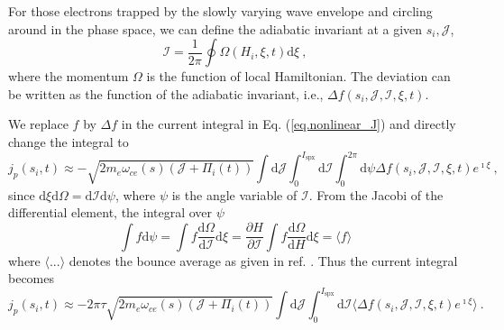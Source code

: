 For those electrons trapped by the slowly varying wave envelope and circling around in the phase space, we can define the adiabatic invariant at a given $s_i,\mathcal{J}$,
\begin{equation}\label{eq.def_I}
    \mathcal{I} = \frac{1}{2\pi} \oint \Omega(H_i,\xi,t) \mathrm{d} \xi~,
\end{equation}
where the momentum $\Omega$ is the function of local Hamiltonian.
The deviation can be written as the function of the adiabatic invariant, i.e., $\Delta f(s_i,\mathcal{J},\mathcal{I},\xi,t)$.

We replace $f$ by $\Delta f$ in the current integral in Eq. (\ref{eq.nonlinear_J}) and directly change the integral to 
\begin{equation}
    j_p(s_i,t) \approx - \sqrt{2m_e\omega_{ce}(s)(\mathcal{J} + \Pi_i(t))}\int\mathrm{d} \mathcal{J} \int_0^{I_{\mathrm{s p x}}}  \mathrm{d}\mathcal{I}  \int_0^{2\pi} \mathrm{d}\psi  \Delta f(s_i,\mathcal{J},\mathcal{I},\xi,t)e^{\imath \xi}  ~,
\end{equation}
since $\mathrm{d}\xi\mathrm{d}\Omega = \mathrm{d}\mathcal{I}\mathrm{d}\psi$, where $\psi$ is the angle variable of $\mathcal{I}$.
From the Jacobi of the differential element, the integral over $\psi$ 
\begin{equation}
      \int f \mathrm{d}\psi = \int f \frac{\mathrm{d}\Omega}{\mathrm{d}\mathcal{I}}\mathrm{d}\xi = \frac{\partial H}{\partial \mathcal{I}}  \int f \frac{\mathrm{d}\Omega}{\mathrm{d} H}\mathrm{d}\xi = \langle f \rangle
\end{equation}
where $\langle ... \rangle$ denotes the bounce average as given in ref. \cite{berk1999}.
Thus the current integral becomes
\begin{equation}
    j_p(s_i,t) \approx -  {2\pi \tau} \sqrt{2m_e\omega_{ce}(s)(\mathcal{J} + \Pi_i(t))}\int\mathrm{d} \mathcal{J} \int_0^{I_{\mathrm{s p x}}}\mathrm{d}\mathcal{I}  \langle \Delta f(s_i,\mathcal{J},\mathcal{I},\xi,t)e^{\imath \xi} \rangle  ~.
\end{equation}

